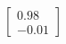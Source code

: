 \documentclass[preview]{standalone}
\begin{document}
\begin{align*}
\begin{bmatrix} 0.98 \\ -0.01 \end{bmatrix}
\end{align*}
\end{document}
